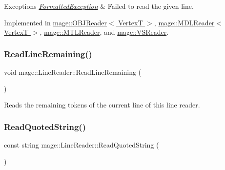 \begin{DoxyExceptions}{Exceptions}
{\em \hyperlink{classmage_1_1_formatted_exception}{Formatted\+Exception}} & Failed to read the given line. \\
\hline
\end{DoxyExceptions}


Implemented in \hyperlink{classmage_1_1_o_b_j_reader_a8d4bd7be6de3098ba899cc36e3be1283}{mage\+::\+O\+B\+J\+Reader$<$ Vertex\+T $>$}, \hyperlink{classmage_1_1_m_d_l_reader_ac50f9cce64621b0a218b6778a611a702}{mage\+::\+M\+D\+L\+Reader$<$ Vertex\+T $>$}, \hyperlink{classmage_1_1_m_t_l_reader_ac3981549364be195f96b32cfafc8b147}{mage\+::\+M\+T\+L\+Reader}, and \hyperlink{classmage_1_1_v_s_reader_a3a3ba09b410e2144ed082db5f1da3113}{mage\+::\+V\+S\+Reader}.

\hypertarget{classmage_1_1_line_reader_a3a4b99bfef1e8a826d74a01bcc663fcb}{}\label{classmage_1_1_line_reader_a3a4b99bfef1e8a826d74a01bcc663fcb} 
\subsubsection{\texorpdfstring{Read\+Line\+Remaining()}{ReadLineRemaining()}}
{\footnotesize\ttfamily void mage\+::\+Line\+Reader\+::\+Read\+Line\+Remaining (\begin{DoxyParamCaption}{ }\end{DoxyParamCaption})\hspace{0.3cm}{\ttfamily [protected]}}

Reads the remaining tokens of the current line of this line reader. \hypertarget{classmage_1_1_line_reader_ae9a7547d01b29c3237b198444d4f3aef}{}\label{classmage_1_1_line_reader_ae9a7547d01b29c3237b198444d4f3aef} 
\subsubsection{\texorpdfstring{Read\+Quoted\+String()}{ReadQuotedString()}}
{\footnotesize\ttfamily const string mage\+::\+Line\+Reader\+::\+Read\+Quoted\+String (\begin{DoxyParamCaption}{ }\end{DoxyParamCaption})\hspace{0.3cm}{\ttfamily [protected]}}

